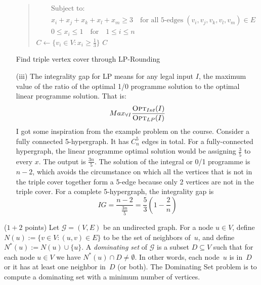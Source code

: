 \documentclass{article}
\newcommand{\G}{\ensuremath{\mathcal{G}}}
\newcommand{\graph}{\G}
\newcommand{\domset}{{\sc Dominating Set}\xspace}
\renewcommand{\leq}{\leqslant}
\renewcommand{\geq}{\geqslant}
\newcounter{rcounter}
\newenvironment{rlist}%
{\begin{list}{\setnr-\arabic{rcounter}}{\usecounter{rcounter}}}{\end{list}}
\begin{document}
\begin{rlist}
\begin{enumerate}
\begin{algorithm}
\begin{quotation}
\begin{algorithmic}[1]
\begin{eqnarray*}
                            &&\textrm{Subject to:}\\
                            && x_i+x_j+x_k+x_l+x_m \geq 3 \quad \textrm{for all 5-edges} \; (v_i, v_j, v_k, v_l, v_m) \in  E\\
                            && 0 \leq x_i \leq 1 \quad \textrm{for} \quad 1\leq i \leq n
                        \end{eqnarray*}
                        \State $C \gets \{v_i \in V: x_i \geq \frac{1}{3} \}$
                        \State \Return $C$
                    \end{algorithmic}
                \end{quotation}
                \caption{Find  triple vertex cover through LP-Rounding}
            \end{algorithm}
            \item[(iii)] The integrality gap for LP means for any legal input $I$, the maximum value of the ratio of the optimal 1/0 programme
            solution to the optimal linear programme solution. That is:
            $$Max_{\forall{I}} \frac{\textrm{\sc Opt}_{Int}(I)}{\textrm{\sc Opt}_{LP}(I)}$$
            I got some inspiration from the example problem on the course. Consider a fully connected 5-hypergraph. It has $C_{n}^{5}$ edges in total.
            For a fully-connected hypergraph, the linear programme optimal solution would be assigning $\frac{3}{5}$ to every $x$. The output is 
            $\frac{3n}{5}$. The solution of the integral or 0/1 programme is $n-2$, which avoids the circumstance on which all the vertices
            that is not in the triple cover together form a 5-edge because only 2 vertices are not in the triple cover. For a complete 5-hypergraph,
            the integrality gap is
            $$IG=\frac{n-2}{\frac{3n}{5}} = \frac{5}{3} (1-\frac{2}{n})$$
        \end{enumerate}
        \item ($1+2$ points)
        Let $\graph=(V,E)$ be an undirected graph. For a node $u\in V$, define $N(u) := \{ v \in V: (u,v) \in E\}$ to be the set of neighbors of~$u$, and define $N^*(u) := N(u) \cup \{ u\}$. A \emph{dominating set} of $\graph$ is a subset $D\subseteq V$ such that for each node $u\in V$ we have $N^*(u) \cap D \neq \emptyset$. In other words, each node~$u$ is in~$D$ or it has at least one neighbor in~$D$ (or both). The \domset problem is to compute a dominating set with a minimum number of vertices.

\end{rlist}
\end{document}
